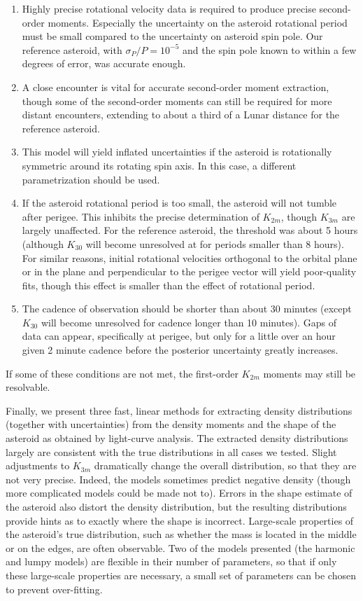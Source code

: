 \documentclass[fleqn,usenatbib]{mnras}
\begin{document}
\begin{enumerate}
  \item Highly precise rotational velocity data is required to produce precise second-order moments. Especially the uncertainty on the asteroid rotational period must be small compared to the uncertainty on asteroid spin pole. Our reference asteroid, with $\sigma_P/P = 10^{-5}$ and the spin pole known to within a few degrees of error, was accurate enough.
  \item A close encounter is vital for accurate second-order moment extraction, though some of the second-order moments can still be required for more distant encounters, extending to about a third of a Lunar distance for the reference asteroid.
  \item This model will yield inflated uncertainties if the asteroid is rotationally symmetric around its rotating spin axis. In this case, a different parametrization should be used. 
  \item If the asteroid rotational period is too small, the asteroid will not tumble after perigee. This inhibits the precise determination of $K_{2m}$, though $K_{3m}$ are largely unaffected. For the reference asteroid, the threshold was about 5 hours (although $K_{30}$ will become unresolved at for periods smaller than 8 hours). For similar reasons, initial rotational velocities orthogonal to the orbital plane or in the plane and perpendicular to the perigee vector will yield poor-quality fits, though this effect is smaller than the effect of rotational period.
  \item The cadence of observation should be shorter than about 30 minutes (except $K_{30}$ will become unresolved for cadence longer than 10 minutes). Gaps of data can appear, specifically at perigee, but only for a little over an hour given 2 minute cadence before the posterior uncertainty greatly increases.
\end{enumerate}

If some of these conditions are not met, the first-order $K_{2m}$ moments may still be resolvable.

Finally, we present three fast, linear methods for extracting density distributions (together with uncertainties) from the density moments and the shape of the asteroid as obtained by light-curve analysis. The extracted density distributions largely are consistent with the true distributions in all cases we tested. Slight adjustments to $K_{3m}$ dramatically change the overall distribution, so that they are not very precise. Indeed, the models sometimes predict negative density (though more complicated models could be made not to). Errors in the shape estimate of the asteroid also distort the density distribution, but the resulting distributions provide hints as to exactly where the shape is incorrect. Large-scale properties of the asteroid's true distribution, such as whether the mass is located in the middle or on the edges, are often observable. Two of the models presented (the harmonic and lumpy models) are flexible in their number of parameters, so that if only these large-scale properties are necessary, a small set of parameters can be chosen to prevent over-fitting.
\end{document}
